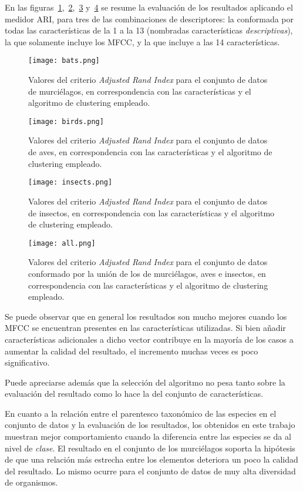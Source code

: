 En las figuras~\ref{img:bats},~\ref{img:birds},~\ref{img:insects} y~\ref{img:all} se resume la evaluación de los resultados aplicando el medidor ARI, para tres de las combinaciones de descriptores: la conformada por todas las características de la 1 a la 13 (nombradas características \textit{descriptivas}), la que solamente incluye los MFCC, y la que incluye a las 14 características.

\begin{figure}[!h]
    \centering
    \texttt{[image: bats.png]}
    \caption{Valores del criterio \textit{Adjusted Rand Index} para el conjunto de datos de murciélagos, en correspondencia con las características y el algoritmo de clustering empleado.}
    \label{img:bats}
\end{figure}

\begin{figure}[!h]
    \centering
    \texttt{[image: birds.png]}
    \caption{Valores del criterio \textit{Adjusted Rand Index} para el conjunto de datos de aves, en correspondencia con las características y el algoritmo de clustering empleado.}
    \label{img:birds}
\end{figure}

\begin{figure}[!h]
    \centering
    \texttt{[image: insects.png]}
    \caption{Valores del criterio \textit{Adjusted Rand Index} para el conjunto de datos de insectos, en correspondencia con las características y el algoritmo de clustering empleado.}
    \label{img:insects}
\end{figure}

\begin{figure}[!h]
    \centering
    \texttt{[image: all.png]}
    \caption{Valores del criterio \textit{Adjusted Rand Index} para el conjunto de datos conformado por la unión de los de murciélagos, aves e insectos, en correspondencia con las características y el algoritmo de clustering empleado.}
    \label{img:all}
\end{figure}

Se puede observar que en general los resultados son mucho mejores cuando los MFCC se encuentran presentes en las características utilizadas.
Si bien añadir características adicionales a dicho vector contribuye en la mayoría de los casos a aumentar la calidad del resultado, el incremento muchas veces es poco significativo.

Puede apreciarse además que la selección del algoritmo no pesa tanto sobre la evaluación del resultado como lo hace la del conjunto de características.

En cuanto a la relación entre el parentesco taxonómico de las especies en el conjunto de datos y la evaluación de los resultados,
los obtenidos en este trabajo muestran mejor comportamiento cuando la diferencia entre las especies se da al nivel de \textit{clase}.
El resultado en el conjunto de los murciélagos soporta la hipótesis de que una relación más estrecha entre los elementos deteriora un poco la calidad del resultado.
Lo mismo ocurre para el conjunto de datos de muy alta diversidad de organismos.